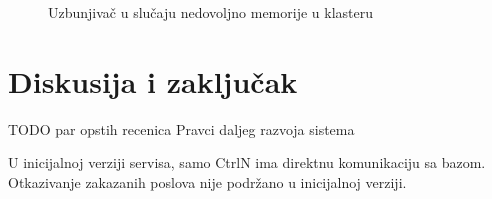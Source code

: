 \documentclass[12pt,oneside]{memoir}
\begin{document}
\begin{figure}[!ht]
  \centering
  \caption{Uzbunjivač u slučaju nedovoljno memorije u klasteru}
  \label{fig:alertmemory}
\end{figure}


\chapter{Diskusija i zaključak}
\label{chp:diskusijaizakljucak}

TODO par opstih recenica Pravci daljeg razvoja sistema

U inicijalnoj verziji servisa, samo CtrlN ima direktnu komunikaciju sa bazom.
Otkazivanje zakazanih poslova nije podržano u inicijalnoj verziji.
\end{document}
